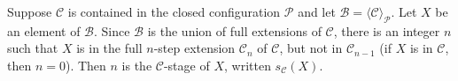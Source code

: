 Suppose $\mathcal{C}$ is contained in the closed configuration $\mathcal{P}$ and let $\mathcal{B} = \langle \mathcal{C} \rangle_{\mathcal{P}}$. Let $X$ be an element of $\mathcal{B}$. Since $\mathcal{B}$ is the union of full extensions of $\mathcal{C}$, there is an integer $n$ such that $X$ is in the full $n$-step extension $\mathcal{C}_n$ of $\mathcal{C}$, but not in $\mathcal{C}_{n-1}$ (if $X$ is in $\mathcal{C}$, then $n = 0$). Then $n$ is the $\mathcal{C}$-stage of $X$, written $s_{\mathcal{C}}(X)$.
